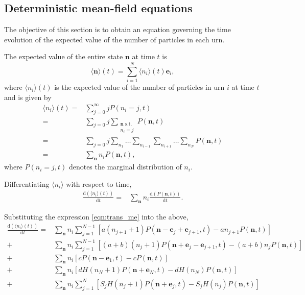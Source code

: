 \documentclass[a4paper,11pt]{report}
\numberwithin{equation}{section}
\newcommand{\diff}[2]{\frac{\mathrm{d} #1}{\mathrm{d} #2}}
\newcommand{\V}[1]{\mathbf{#1}}
\newcommand{\E}[1]{\langle #1 \rangle}
\begin{document}
\subsection{Deterministic mean-field equations}
The objective of this section is to obtain an equation governing the time
evolution of the expected value of the number of particles in each urn.

The expected value of the entire state \(\V{n}\) at time \(t\) is
\begin{equation*}
    \E{\V{n}}(t) = \sum_{i=1}^N \langle n_i \rangle(t) \V{e}_i,
\end{equation*}
where \(\E{n_i}(t)\) is the expected value of the number of particles in urn
\(i\) at time \(t\) and is given by
\begin{align*}
    \E{n_i}(t) =& \sum_{j=0}^\infty j P(n_i = j,t)\\
    =& \sum_{j=0} j
    \sum_{\substack{\V{n} \text{ s.t.} \\ n_i=j}} P(\V{n},t)\\
    =& \sum_{j=0} j
    \sum_{n_1} \dotso \sum_{n_{i-1}} \sum_{n_{i+1}} \dotso \sum_{n_N} P(\V{n},t)\\
    =& \sum_{\V{n}} n_i P(\V{n},t),
\end{align*}
where \(P(n_i = j,t)\) denotes the marginal distribution of \(n_i\).

Differentiating \(\E{n_i}\) with respect to time,
\begin{align*}
    \diff{(\E{n_i}(t))}{t} =& \sum_{\V{n}} n_i \diff{(P(\V{n},t))}{t}.
\end{align*}

Substituting the expression \eqref{eqn:trans_me} into the above,
\begin{subequations}
\begin{align}
    \label{eqn:trans_expectation_hl_term}
    \diff{(\E{n_i}(t))}{t}
    = & \sum_\V{n} n_i \sum_{j=1}^{N-1}
    \left[a(n_{j+1}+1) P(\V{n} - \V{e}_j + \V{e}_{j+1},t) -
        an_{j+1} P(\V{n},t)\right] \\
    \label{eqn:trans_expectation_hr_term}
    + & \sum_\V{n} n_i \sum_{j=1}^{N-1}
    \left[(a+b)(n_j+1) P(\V{n} + \V{e}_j - \V{e}_{j+1},t) -
        (a+b)n_j P(\V{n},t)\right] \\
    \label{eqn:trans_expectation_in_term}
    + & \sum_\V{n} n_i
    \left[c P(\V{n} - \V{e}_1,t) - c P(\V{n},t)\right] \\
    \label{eqn:trans_expectation_out_term}
    + & \sum_\V{n} n_i
    \left[d H(n_N+1) P(\V{n} + \V{e}_N,t) - d H(n_N) P(\V{n},t)\right] \\
    \label{eqn:trans_expectation_rem_term}
    + & \sum_\V{n} n_i \sum_{j=1}^{N}
    \left[S_j H(n_j + 1) P(\V{n} + \V{e}_j,t) - S_j H(n_j) P(\V{n},t)\right]
\end{align}
\end{subequations}
\end{document}

